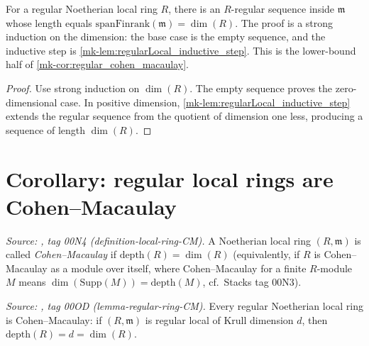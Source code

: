 \begin{lemma}\label{mk-lem:exists_isRegular_of_regularLocal}
  \leanok

  For a regular Noetherian local ring \(R\), there is an \(R\)-regular sequence inside
  \(\mathfrak m\) whose length equals \(\text{spanFinrank}(\mathfrak m) = \dim(R)\). The proof is a
  strong induction on the dimension: the base case is the empty sequence, and the
  inductive step is \ref{mk-lem:regularLocal_inductive_step}. This is the lower-bound half
  of \ref{mk-cor:regular_cohen_macaulay}.
\end{lemma}
\begin{proof}
  \leanok

Use strong induction on \(\dim(R)\). The empty sequence proves the
  zero-dimensional case. In positive dimension,
  \ref{mk-lem:regularLocal_inductive_step} extends the regular sequence from
  the quotient of dimension one less, producing a sequence of length
  \(\dim(R)\).
\end{proof}

\section{Corollary: regular local rings are Cohen--Macaulay}
\label{mk-sec:ab_regular_cm}

\begin{definition}\label{mk-def:cohen_macaulay_local}
  \leanok

  \textit{Source: \cite{stacks-project}, tag 00N4 (definition-local-ring-CM).}
  A Noetherian local ring \((R, \mathfrak{m})\) is called \emph{Cohen--Macaulay} if
  \(\text{depth}(R) = \dim(R)\) (equivalently, if \(R\) is Cohen--Macaulay as a module
  over itself, where Cohen--Macaulay for a finite \(R\)-module \(M\) means
  \(\dim(\text{Supp}(M)) = \text{depth}(M)\), cf.\ Stacks tag 00N3).
\end{definition}

\begin{corollary}\label{mk-cor:regular_cohen_macaulay}
  \leanok

  \textit{Source: \cite{stacks-project}, tag 00OD (lemma-regular-ring-CM).}
  Every regular Noetherian local ring is Cohen--Macaulay: if \((R, \mathfrak{m})\) is
  regular local of Krull dimension \(d\), then \(\text{depth}(R) = d = \dim(R)\).
\end{corollary}

